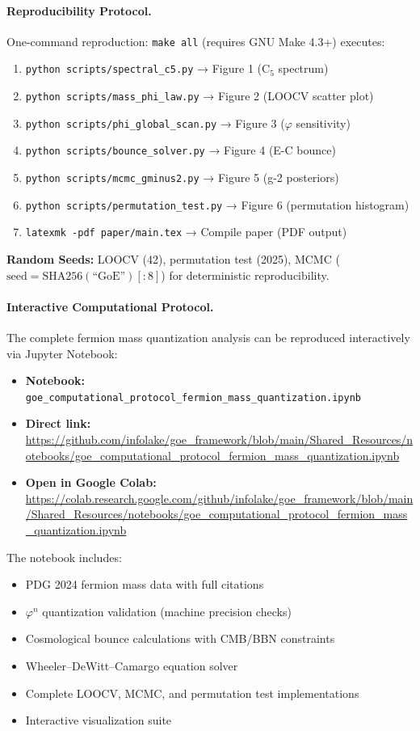 \documentclass[12pt]{article}
\begin{document}
\paragraph{Reproducibility Protocol.}
One-command reproduction: \texttt{make all} (requires GNU Make 4.3+) executes:
\begin{enumerate}
\item \texttt{python scripts/spectral\_c5.py} → Figure 1 (C$_5$ spectrum)
\item \texttt{python scripts/mass\_phi\_law.py} → Figure 2 (LOOCV scatter plot)
\item \texttt{python scripts/phi\_global\_scan.py} → Figure 3 ($\varphi$ sensitivity)
\item \texttt{python scripts/bounce\_solver.py} → Figure 4 (E-C bounce)
\item \texttt{python scripts/mcmc\_gminus2.py} → Figure 5 (g-2 posteriors)
\item \texttt{python scripts/permutation\_test.py} → Figure 6 (permutation histogram)
\item \texttt{latexmk -pdf paper/main.tex} → Compile paper (PDF output)
\end{enumerate}

\noindent\textbf{Random Seeds:} LOOCV (42), permutation test (2025), MCMC ($\text{seed} = \text{SHA256}(\text{``GoE''})[:8]$) for deterministic reproducibility.

\paragraph{Interactive Computational Protocol.}
The complete fermion mass quantization analysis can be reproduced interactively via Jupyter Notebook:

\begin{itemize}
\item \textbf{Notebook:} \texttt{goe\_computational\_protocol\_fermion\_mass\_quantization.ipynb}
\item \textbf{Direct link:} \url{https://github.com/infolake/goe_framework/blob/main/Shared_Resources/notebooks/goe_computational_protocol_fermion_mass_quantization.ipynb}
\item \textbf{Open in Google Colab:} \url{https://colab.research.google.com/github/infolake/goe_framework/blob/main/Shared_Resources/notebooks/goe_computational_protocol_fermion_mass_quantization.ipynb}
\end{itemize}

\noindent The notebook includes:
\begin{itemize}
\item PDG 2024 fermion mass data with full citations
\item $\varphi^n$ quantization validation (machine precision checks)
\item Cosmological bounce calculations with CMB/BBN constraints
\item Wheeler--DeWitt--Camargo equation solver
\item Complete LOOCV, MCMC, and permutation test implementations
\item Interactive visualization suite
\end{itemize}
\end{document}
